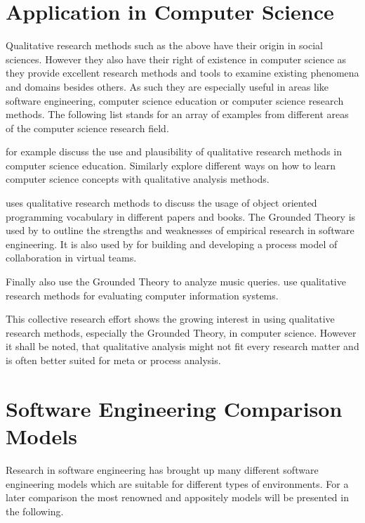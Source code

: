 
\section{Application in Computer Science} %

Qualitative research methods such as the above have their origin in social
sciences. However they also have their right of existence in computer science
as they provide excellent research methods and tools to examine existing
phenomena and domains besides others. As such they are especially useful in
areas like software engineering, computer science education or computer science
research methods. The following list stands for an array of examples from
different areas of the computer science research field.

\textcite{Hazzan2006} for example discuss the use and plausibility of
qualitative research methods in computer science education. Similarly
\textcite{Meerbaum-Salant2010} explore different ways on how to learn computer
science concepts with qualitative analysis methods.

\textcite{Armstrong2006} uses qualitative research methods to discuss the usage
of object oriented programming vocabulary in different papers and books. The
Grounded Theory is used by \textcite{Perry2000} to outline the strengths and
weaknesses of empirical research in software engineering. It is also used by
\textcite{Sarker2001} for building and developing a process model of
collaboration in virtual teams.

Finally also \textcite{Bainbridge2003} use the Grounded Theory to analyze
music queries. \textcite{Kaplan1994} use qualitative research methods for
evaluating computer information systems.

This collective research effort shows the growing interest in using qualitative
research methods, especially the Grounded Theory, in computer science. However
it shall be noted, that qualitative analysis might not fit every research
matter and is often better suited for meta or process analysis.


\section{Software Engineering Comparison Models} %

Research in software engineering has brought up many different software
engineering models which are suitable for different types of environments. For
a later comparison the most renowned and appositely models will be presented in
the following.

